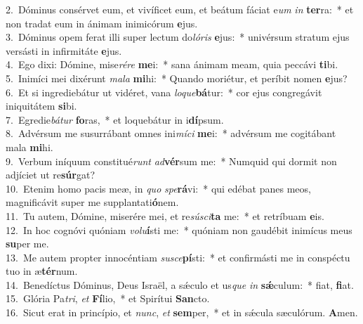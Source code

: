 {2.~}Dóminus consérvet eum, et vivíficet eum, et beátum fáciat e\textit{um} \textit{in} \textbf{ter}ra:~* et non tradat eum in ánimam inimicórum \textbf{e}jus.\\
{3.~}Dóminus opem ferat illi super lectum do\textit{ló}\textit{ris} \textbf{e}jus:~* univérsum stratum ejus versásti in infirmitáte \textbf{e}jus.\\
{4.~}Ego dixi: Dómine, mise\textit{ré}\textit{re} \textbf{me}i:~* sana ánimam meam, quia peccávi \textbf{ti}bi.\\
{5.~}Inimíci mei dixérunt \textit{ma}\textit{la} \textbf{mi}hi:~* Quando moriétur, et períbit nomen \textbf{e}jus?\\
{6.~}Et si ingrediebátur ut vidéret, vana \textit{lo}\textit{que}\textbf{bá}tur:~* cor ejus congregávit iniquitátem \textbf{si}bi.\\
{7.~}Egredie\textit{bá}\textit{tur} \textbf{fo}ras,~* et loquebátur in i\textbf{dí}psum.\\
{8.~}Advérsum me susurrábant omnes ini\textit{mí}\textit{ci} \textbf{me}i:~* advérsum me cogitábant mala \textbf{mi}hi.\\
{9.~}Verbum iníquum constitué\textit{runt} \textit{ad}\textbf{vér}sum me:~* Numquid qui dormit non adjíciet ut re\textbf{súr}gat?\\
{10.~}Etenim homo pacis meæ, in \textit{quo} \textit{spe}\textbf{rá}vi:~* qui edébat panes meos, magnificávit super me supplantati\textbf{ó}nem.\\
{11.~}Tu autem, Dómine, miserére mei, et re\textit{sú}\textit{sci}\textbf{ta} me:~* et retríbuam \textbf{e}is.\\
{12.~}In hoc cognóvi quóniam \textit{vo}\textit{lu}\textbf{í}sti me:~* quóniam non gaudébit inimícus meus \textbf{su}per me.\\
{13.~}Me autem propter innocéntiam \textit{su}\textit{sce}\textbf{pí}sti:~* et confirmásti me in conspéctu tuo in æ\textbf{tér}num.\\
{14.~}Benedíctus Dóminus, Deus Israël, a sǽculo et us\textit{que} \textit{in} \textbf{sǽ}culum:~* fiat, \textbf{fi}at.\\
{15.~}Glória Pa\textit{tri}, \textit{et} \textbf{Fí}lio,~* et Spirítui \textbf{San}cto.\\
{16.~}Sicut erat in princípio, et \textit{nunc}, \textit{et} \textbf{sem}per,~* et in sǽcula sæculórum. \textbf{A}men.\\
